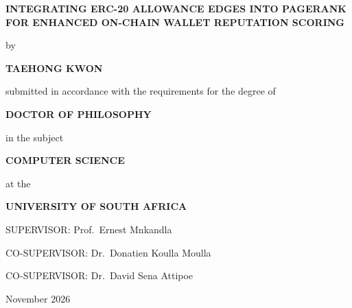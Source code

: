 \begin{titlepage}
\centering
\vspace*{0.4cm}
{\Large\bfseries INTEGRATING ERC-20 ALLOWANCE EDGES INTO PAGERANK FOR ENHANCED ON-CHAIN WALLET REPUTATION SCORING\par}
\vfill
{by\par}
\vspace{0.7cm}
{\large\bfseries TAEHONG KWON\par}
\vfill
{submitted in accordance with the requirements for the degree of\par}
\vspace{0.7cm}
{\large\bfseries DOCTOR OF PHILOSOPHY\par}
\vspace{0.35cm}
{in the subject\par}
\vspace{0.7cm}
{\large\bfseries COMPUTER SCIENCE\par}
\vfill
{at the\par}
\vspace{0.7cm}
{\large\bfseries UNIVERSITY OF SOUTH AFRICA\par}
\vfill
{SUPERVISOR: Prof.~Ernest Mnkandla\par}
\vspace{0.35cm}
{CO-SUPERVISOR: Dr.~Donatien Koulla Moulla\par}
\vspace{0.35cm}
{CO-SUPERVISOR: Dr.~David Sena Attipoe\par}
\vfill
{November 2026\par}
\end{titlepage}
\restoregeometry
